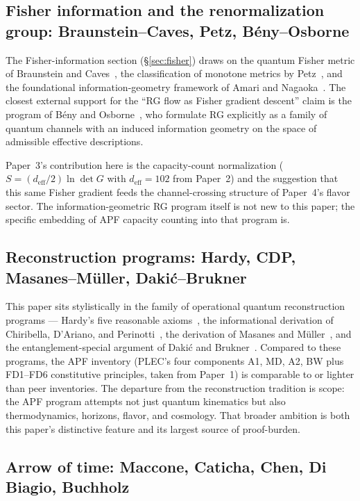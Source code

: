 \documentclass[11pt]{article}
\begin{document}
\subsection{Fisher information and the renormalization group: Braunstein--Caves, Petz, Bény--Osborne}

The Fisher-information section (\S\ref{sec:fisher}) draws on the quantum
Fisher metric of Braunstein and Caves~\cite{BraunsteinCaves1994}, the
classification of monotone metrics by Petz~\cite{Petz1996}, and the
foundational information-geometry framework of Amari and
Nagaoka~\cite{AmariNagaoka2000}.  The closest external support for the
``RG flow as Fisher gradient descent'' claim is the program of B\'eny and
Osborne~\cite{BenyOsborne2015}, who formulate RG explicitly as a family of
quantum channels with an induced information geometry on the space of
admissible effective descriptions.

Paper~3's contribution here is the capacity-count normalization
($S = (d_{\mathrm{eff}}/2)\ln\det G$ with $d_{\mathrm{eff}} = 102$ from
Paper~2) and the suggestion that this same Fisher gradient feeds the
channel-crossing structure of Paper~4's flavor sector.  The
information-geometric RG program itself is not new to this paper; the
specific embedding of APF capacity counting into that program is.

\subsection{Reconstruction programs: Hardy, CDP, Masanes--M\"uller, Daki\'c--Brukner}

This paper sits stylistically in the family of operational quantum
reconstruction programs --- Hardy's five reasonable axioms~\cite{Hardy2001},
the informational derivation of Chiribella, D'Ariano, and
Perinotti~\cite{CDP2011}, the derivation of Masanes and
M\"uller~\cite{MM2011}, and the entanglement-special argument of Daki\'c
and Brukner~\cite{DakicBrukner2009}.  Compared to these programs, the
APF inventory (PLEC's four components A1, MD, A2, BW plus FD1--FD6
constitutive principles, taken from Paper~1) is comparable to or lighter
than peer inventories.  The departure from the reconstruction tradition is
scope: the APF program attempts not just quantum kinematics but also
thermodynamics, horizons, flavor, and cosmology.  That broader ambition is
both this paper's distinctive feature and its largest source of
proof-burden.

\subsection{Arrow of time: Maccone, Caticha, Chen, Di Biagio, Buchholz}
\end{document}
